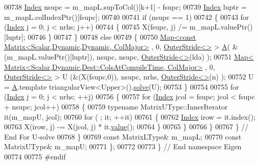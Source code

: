 \begin{DoxyCode}
00738       \hyperlink{namespace_eigen_a62e77e0933482dafde8fe197d9a2cfde}{Index} nsupc = m\_mapL.supToCol()[k+1] - fsupc;
00739       \hyperlink{namespace_eigen_a62e77e0933482dafde8fe197d9a2cfde}{Index} luptr = m\_mapL.colIndexPtr()[fsupc];
00740 
00741       \textcolor{keywordflow}{if} (nsupc == 1)
00742       \{
00743         \textcolor{keywordflow}{for} (\hyperlink{namespace_eigen_a62e77e0933482dafde8fe197d9a2cfde}{Index} j = 0; j < nrhs; j++)
00744         \{
00745           X(fsupc, j) /= m\_mapL.valuePtr()[luptr];
00746         \}
00747       \}
00748       \textcolor{keywordflow}{else}
00749       \{
00750         \hyperlink{group___core___module_class_eigen_1_1_map}{Map<const Matrix<Scalar,Dynamic,Dynamic, ColMajor>}
      , 0, \hyperlink{class_eigen_1_1_outer_stride}{OuterStride<>} > \hyperlink{group___core___module_class_eigen_1_1_matrix}{A}( &(m\_mapL.valuePtr()[luptr]), nsupc, nsupc, 
      \hyperlink{class_eigen_1_1_outer_stride}{OuterStride<>}(lda) );
00751         \hyperlink{group___core___module_class_eigen_1_1_map}{Map< Matrix<Scalar,Dynamic,Dest::ColsAtCompileTime, ColMajor>}
      , 0, \hyperlink{class_eigen_1_1_outer_stride}{OuterStride<>} > U (&(X(fsupc,0)), nsupc, nrhs, \hyperlink{class_eigen_1_1_outer_stride}{OuterStride<>}(n) );
00752         U = \hyperlink{group___core___module_class_eigen_1_1_matrix}{A}.template triangularView<Upper>().\hyperlink{group___sparse_core___module_a4a66e9498b06e3ec4ec36f06b26d4e8f}{solve}(U);
00753       \}
00754 
00755       \textcolor{keywordflow}{for} (\hyperlink{namespace_eigen_a62e77e0933482dafde8fe197d9a2cfde}{Index} j = 0; j < nrhs; ++j)
00756       \{
00757         \textcolor{keywordflow}{for} (\hyperlink{namespace_eigen_a62e77e0933482dafde8fe197d9a2cfde}{Index} jcol = fsupc; jcol < fsupc + nsupc; jcol++)
00758         \{
00759           \textcolor{keyword}{typename} MatrixUType::InnerIterator it(m\_mapU, jcol);
00760           \textcolor{keywordflow}{for} ( ; it; ++it)
00761           \{
00762             \hyperlink{namespace_eigen_a62e77e0933482dafde8fe197d9a2cfde}{Index} irow = it.index();
00763             X(irow, j) -= X(jcol, j) * it.\hyperlink{group___core___module_a8da735a6bfc7012606acf787156d10a0}{value}();
00764           \}
00765         \}
00766       \}
00767     \} \textcolor{comment}{// End For U-solve}
00768   \}
00769   \textcolor{keyword}{const} MatrixLType& m\_mapL;
00770   \textcolor{keyword}{const} MatrixUType& m\_mapU;
00771 \};
00772 
00773 \} \textcolor{comment}{// End namespace Eigen }
00774 
00775 \textcolor{preprocessor}{#endif}
\end{DoxyCode}
